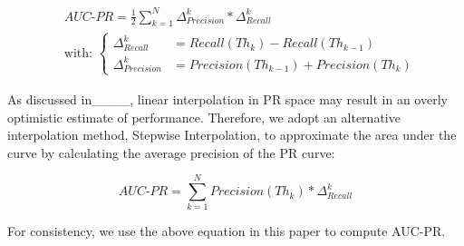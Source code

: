 {\footnotesize
\begin{equation}
\begin{split}
&AUC\text{-}PR = \frac{1}{2}\sum_{k=1}^{N} \Delta^{k}_{Precision}*\Delta^{k}_{Recall}\\
&\text{with: } \left.
\begin{cases}
\Delta^{k}_{Recall} &= Recall(Th_{k})-Recall(Th_{k-1})\\
\Delta^{k}_{Precision} &= Precision(Th_{k-1})+Precision(Th_{k})
\end{cases}
\right. 
\end{split}
\label{equAUCPR}
\end{equation}
}

\noindent As discussed in____, linear interpolation in PR space may result in an overly optimistic estimate of performance. Therefore, we adopt an alternative interpolation method, Stepwise Interpolation, to approximate the area under the curve by calculating the average precision of the PR curve:

\begin{equation}
AUC\text{-}PR = \sum_{k=1}^{N} Precision(Th_{k})*\Delta^{k}_{Recall}
\end{equation}

\noindent For consistency, we use the above equation in this paper to compute AUC-PR.